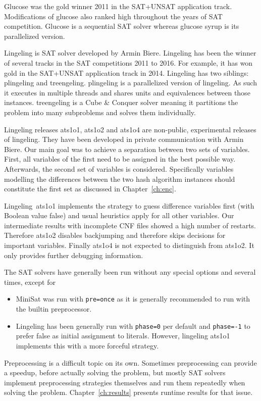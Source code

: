 Glucose was the gold winner 2011 in the SAT+UNSAT application track.
Modifications of glucose also ranked high throughout the years of SAT competition.
Glucose is a sequential SAT solver whereas glucose syrup is its parallelized
version.

Lingeling is SAT solver developed by Armin Biere. Lingeling has been the
winner of several tracks in the SAT competitions 2011 to 2016. For example,
it has won gold in the SAT+UNSAT application track in 2014.
Lingeling has two siblings: plingeling and treengeling. plingeling is a
parallelized version of lingeling. As such it executes in multiple threads
and shares units and equivalences between those instances. treengeling
is a Cube \& Conquer solver meaning it partitions the problem into many
subproblems and solves them individually.

Lingeling releases ats1o1, ats1o2 and ats1o4 are non-public, experimental
releases of lingeling.
They have been developed in private communication with Armin Biere.
Our main goal was to achieve a separation between two sets of variables.
First, all variables of the first need to be assigned in the best possible
way. Afterwards, the second set of variables is considered.
Specifically variables modelling the differences between the two hash
algorithm instances should constitute the first set as discussed in
Chapter~\ref{ch:enc}.

Lingeling~ats1o1 implements the strategy to guess difference variables first (with Boolean value false) and
usual heuristics apply for all other variables.
Our intermediate results with incomplete CNF files showed a high number of restarts.
Therefore ats1o2 disables backjumping and therefore skips decisions for important variables.
Finally ats1o4 is not expected to distinguish from ats1o2. It only provides further debugging information.

The SAT solvers have generally been run without any special options
and several times, except for
\begin{itemize}
  \item MiniSat was run with \texttt{\textendash{}\textendash{}pre=once} as it is generally recommended to run with the builtin preprocessor.
  \item Lingeling has been generally run with
    \texttt{\textendash{}\textendash{}phase=0} per default and
    \texttt{\textendash{}\textendash{}phase=-1} to prefer false as initial assignment to literals.
    However, lingeling ats1o1 implements this with a more forceful strategy.
\end{itemize}


Preprocessing is a difficult topic on its own. Sometimes preprocessing can provide a speedup,
before actually solving the problem, but mostly SAT solvers implement preprocessing strategies
themselves and run them repeatedly when solving the problem. Chapter~\ref{ch:results}
presents runtime results for that issue.
